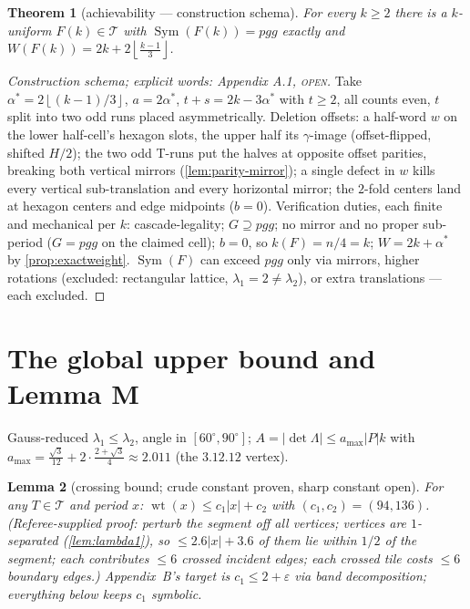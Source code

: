 \documentclass[11pt,a4paper,oneside]{article}
\theoremstyle{plain}
\newtheorem{theorem}{Theorem}[section]
\newtheorem{lemma}[theorem]{Lemma}
\theoremstyle{definition}
\theoremstyle{remark}
\DeclareMathOperator{\wt}{wt}
\DeclareMathOperator{\Sym}{Sym}
\newcommand{\Tcl}{\mathcal{T}}
\newcommand{\fl}[1]{\left\lfloor #1 \right\rfloor}
\newcommand{\ceilw}{2k + 2\fl{\tfrac{k-1}{3}}}
\newcommand{\statOPEN}{\textcolor{red!60!black}{\textsc{open}}}
\begin{document}
\begin{theorem}[achievability --- construction schema]\label{thm:B}
For every $k \ge 2$ there is a $k$-uniform $F(k) \in \Tcl$ with $\Sym(F(k)) = pgg$ exactly
and $W(F(k)) = \ceilw$.
\end{theorem}
\begin{proof}[Construction schema; explicit words: Appendix A.1, \statOPEN]
Take $\alpha^\ast = 2\fl{(k-1)/3}$, $a = 2\alpha^\ast$, $t + s = 2k - 3\alpha^\ast$ with
$t \ge 2$, all counts even, $t$ split into two odd runs placed asymmetrically. Deletion
offsets: a half-word $w$ on the lower half-cell's hexagon slots, the upper half its
$\gamma$-image (offset-flipped, shifted $H/2$); the two odd T-runs put the halves at
opposite offset parities, breaking both vertical mirrors (\cref{lem:parity-mirror}); a
single defect in $w$ kills every vertical sub-translation and every horizontal mirror; the
$2$-fold centers land at hexagon centers and edge midpoints ($b = 0$). Verification duties,
each finite and mechanical per $k$: cascade-legality; $G \supseteq pgg$; no mirror and no
proper sub-period ($G = pgg$ on the claimed cell); $b = 0$, so $k(F) = n/4 = k$;
$W = 2k + \alpha^\ast$ by \cref{prop:exactweight}. $\Sym(F)$ can exceed $pgg$ only via
mirrors, higher rotations (excluded: rectangular lattice, $\lambda_1 = 2 \ne \lambda_2$),
or extra translations --- each excluded.
\end{proof}

\section{The global upper bound and Lemma M}\label{sec:global}

Gauss-reduced $\lambda_1 \le \lambda_2$, angle in $[60^\circ, 90^\circ]$;
$A = |\det\Lambda| \le a_{\max}|P|k$ with $a_{\max} = \tfrac{\sqrt3}{12} +
2\cdot\tfrac{2+\sqrt3}{4} \approx 2.011$ (the $3.12.12$ vertex).

\begin{lemma}[crossing bound; crude constant proven, sharp constant open]\label{lem:crossing}
For any $T \in \Tcl$ and period $x$: $\wt(x) \le c_1|x| + c_2$ with $(c_1, c_2) =
(94, 136)$. \emph{(Referee-supplied proof: perturb the segment off all vertices; vertices
are $1$-separated (\cref{lem:lambda1}), so $\le 2.6|x| + 3.6$ of them lie within $1/2$ of
the segment; each contributes $\le 6$ crossed incident edges; each crossed tile costs
$\le 6$ boundary edges.)} Appendix~B's target is $c_1 \le 2 + \varepsilon$ via band
decomposition; everything below keeps $c_1$ symbolic.
\end{lemma}
\end{document}
